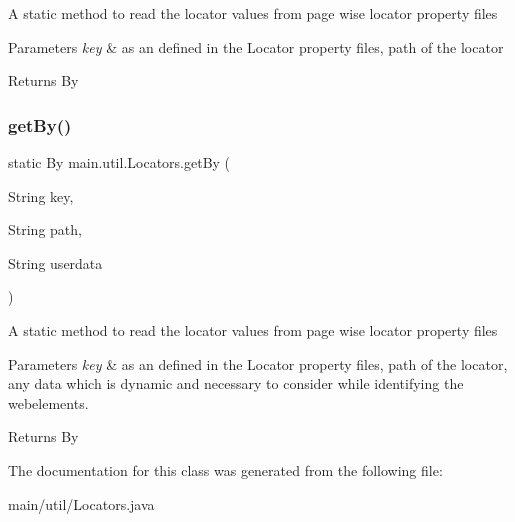 A static method to read the locator values from page wise locator property files 
\begin{DoxyParams}{Parameters}
{\em key} & as an defined in the Locator property files, path of the locator \\
\hline
\end{DoxyParams}
\begin{DoxyReturn}{Returns}
By 
\end{DoxyReturn}
\mbox{\label{classmain_1_1util_1_1_locators_a1c63d6c289e5b1f5f4b0a399cf6d20b6}} 
\subsubsection{\texorpdfstring{get\+By()}{getBy()}\hspace{0.1cm}{\footnotesize\ttfamily [2/2]}}
{\footnotesize\ttfamily static By main.\+util.\+Locators.\+get\+By (\begin{DoxyParamCaption}\item[{String}]{key,  }\item[{String}]{path,  }\item[{String}]{userdata }\end{DoxyParamCaption})\hspace{0.3cm}{\ttfamily [static]}}

A static method to read the locator values from page wise locator property files 
\begin{DoxyParams}{Parameters}
{\em key} & as an defined in the Locator property files, path of the locator, any data which is dynamic and necessary to consider while identifying the webelements. \\
\hline
\end{DoxyParams}
\begin{DoxyReturn}{Returns}
By 
\end{DoxyReturn}


The documentation for this class was generated from the following file\+:\begin{DoxyCompactItemize}
\item 
main/util/Locators.\+java\end{DoxyCompactItemize}
